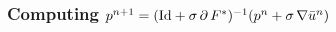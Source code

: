 \documentclass{scrreprt}
\begin{document}

            \subsubsection{Computing $p^{n+1} = (\textnormal{Id} + \sigma\,\partial\,F^{\ast})^{-1}(p^{n} + \sigma\,\nabla\bar{u}^{n})$}
            \label{sub:computing_p}
\end{document}
